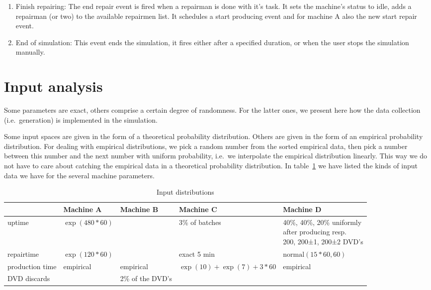 \documentclass{article}
\begin{document}
\begin{enumerate}
    \item Finish repairing:
        The end repair event is fired when a repairman is done with it's task.
        It sets the machine's status to idle, adds a repairman (or two) to the available repairmen list.
        It schedules a start producing event and for machine A also the new start repair event.

    \item End of simulation:
        This event ends the simulation, it fires either after a specified duration, or when the user stops the simulation manually.

\end{enumerate}


\section{Input analysis}
\label{input_analysis}
Some parameters are exact, others comprise a certain degree of randomness.
For the latter ones, we present here how the data collection (i.e.\ generation) is implemented in the simulation.

Some input spaces are given in the form of a theoretical probability distribution.
Others are given in the form of an empirical probability distribution.
For dealing with empirical distributions, we pick a random number from the sorted empirical data, then pick a number between this number and the next number with uniform probability, i.e.\ we interpolate the empirical distribution linearly.
This way we do not have to care about catching the empirical data in a theoretical probability distribution.
In table~\ref{table:input_table} we have listed the kinds of input data we have for the several machine parameters.

\begin{table}[h]
    \begin{tabular}{|l|l|l|l|p{4cm}|}
    \hline
                    & Machine A         & Machine B         & Machine C                     & Machine D \\ \hline
    uptime          & $\exp(480*60)$    &                   & 3\% of batches                & \parbox{5cm}{40\%, 40\%, 20\% uniformly\\ after producing resp.\\ 200, 200±1, 200±2 DVD's} \\ \hline
    repairtime      & $\exp(120*60)$    &                   & exact 5 min                   & $\mathrm{normal}(15*60, 60)$ \\ \hline
    production time & empirical         & empirical         & $\exp(10) + \exp(7) + 3*60$   & empirical \\ \hline
    DVD discards    &                   & 2\% of the DVD's  &                               & \\ \hline
    \end{tabular}
    \caption {Input distributions}
    \label{table:input_table}
\end{table}
\end{document}
